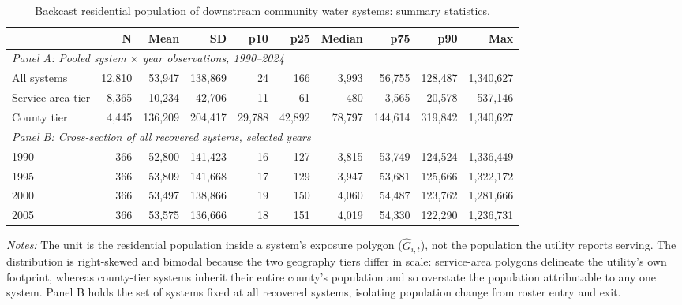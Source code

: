 \begin{table}[ht]
\centering
\caption{Backcast residential population of downstream community water systems: summary statistics.}
\label{tab:backcast_popsum}
\begin{adjustbox}{max width=\textwidth}
\begin{tabular}{lrrrrrrrrr}
\toprule
 & N & Mean & SD & p10 & p25 & Median & p75 & p90 & Max \\
\midrule
\multicolumn{10}{l}{\textit{Panel A: Pooled system $\times$ year observations, 1990--2024}} \\
All systems & 12,810 & 53,947 & 138,869 & 24 & 166 & 3,993 & 56,755 & 128,487 & 1,340,627 \\
\quad Service-area tier & 8,365 & 10,234 & 42,706 & 11 & 61 & 480 & 3,565 & 20,578 & 537,146 \\
\quad County tier & 4,445 & 136,209 & 204,417 & 29,788 & 42,892 & 78,797 & 144,614 & 319,842 & 1,340,627 \\
\midrule
\multicolumn{10}{l}{\textit{Panel B: Cross-section of all recovered systems, selected years}} \\
1990 & 366 & 52,800 & 141,423 & 16 & 127 & 3,815 & 53,749 & 124,524 & 1,336,449 \\
1995 & 366 & 53,809 & 141,668 & 17 & 129 & 3,947 & 53,681 & 125,666 & 1,322,172 \\
2000 & 366 & 53,497 & 138,866 & 19 & 150 & 4,060 & 54,487 & 123,762 & 1,281,666 \\
2005 & 366 & 53,575 & 136,666 & 18 & 151 & 4,019 & 54,330 & 122,290 & 1,236,731 \\
\bottomrule
\end{tabular}
\end{adjustbox}
\begin{minipage}{\textwidth}\footnotesize
\vspace{0.5em}
\textit{Notes:} The unit is the residential population inside a system's exposure polygon ($\hat{G}_{i,t}$), not the population the utility reports serving. The distribution is right-skewed and bimodal because the two geography tiers differ in scale: service-area polygons delineate the utility's own footprint, whereas county-tier systems inherit their entire county's population and so overstate the population attributable to any one system. Panel B holds the set of systems fixed at all recovered systems, isolating population change from roster entry and exit.
\end{minipage}
\end{table}
